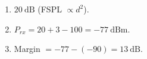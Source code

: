 \begin{enumerate}[leftmargin=1.6em,itemsep=2pt]
\item $20\ \text{dB}$ (FSPL $\propto d^2$).
\item $P_{rx} = 20 + 3 - 100 = -77\ \text{dBm}$.
\item Margin $= -77 - (-90) = 13\ \text{dB}$.
\end{enumerate}
